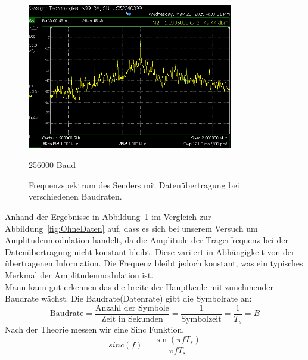 \begin{figure}[H]
    \vspace{0.5cm}
    \begin{minipage}{0.1\textwidth}
    \end{minipage}
    \hfill
    \begin{minipage}{0.47\textwidth}
        \centering
        \includegraphics[width=0.8\textwidth]{Pictures/4.4C.256000.png}
        \caption*{256000 Baud}
    \end{minipage}
    \hfill
    \begin{minipage}{0.1\textwidth}
    \end{minipage}

    \caption{Frequenzspektrum des Senders mit Datenübertragung bei verschiedenen Baudraten.}
    \label{fig:MitDaten}
\end{figure}

Anhand der Ergebnisse in Abbildung~\ref{fig:MitDaten} im Vergleich zur Abbildung~\ref{fig:OhneDaten} auf, dass es sich bei unserem Versuch um Amplitudenmodulation handelt, da die Amplitude der Trägerfrequenz bei der Datenübertragung nicht konstant bleibt. Diese variiert in Abhängigkeit von der übertragenen Information. Die Frequenz bleibt jedoch konstant, was ein typisches Merkmal der Amplitudenmodulation ist.
\\
Mann kann gut erkennen das die breite der Hauptkeule mit zunehmender Baudrate wächst.
Die Baudrate(Datenrate) gibt die Symbolrate an:
\begin{equation}
    \text{Baudrate} = \frac{\text{Anzahl der Symbole}}{\text{Zeit in Sekunden}}= \frac{1}{\text{Symbolzeit}}= \frac{1}{T_s} = B
\end{equation}
Nach der Theorie messen wir eine Sinc Funktion.
\begin{equation}
    sinc(f) = \frac{\sin(\pi f T_s)}{\pi f T_s}
\end{equation}

